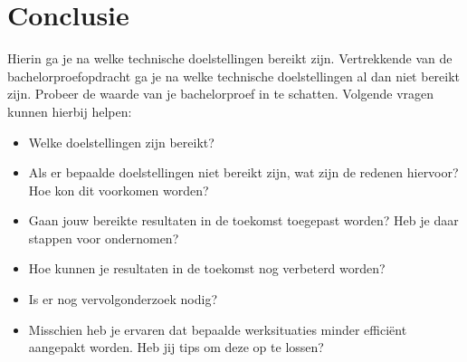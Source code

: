 

\chapter*{Conclusie}%
\label{ch:conclusie}


Hierin ga je na welke technische doelstellingen bereikt zijn. Vertrekkende van de bachelorproefopdracht ga
je na welke technische doelstellingen al dan niet bereikt zijn. Probeer de waarde van je bachelorproef in te
schatten. Volgende vragen kunnen hierbij helpen:

\begin{itemize}[]
    \item Welke doelstellingen zijn bereikt?
    \item Als er bepaalde doelstellingen niet bereikt zijn, wat zijn de redenen hiervoor? Hoe kon dit voorkomen worden?
    \item Gaan jouw bereikte resultaten in de toekomst toegepast worden? Heb je daar stappen voor ondernomen?
    \item Hoe kunnen je resultaten in de toekomst nog verbeterd worden?
    \item Is er nog vervolgonderzoek nodig?
    \item Misschien heb je ervaren dat bepaalde werksituaties minder efficiënt aangepakt worden. Heb jij tips om deze op te lossen?
\end{itemize}
